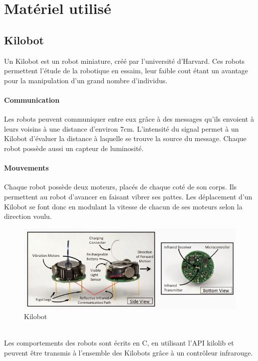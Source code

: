 \documentclass[a4paper]{article}
\begin{document}
\section{Matériel utilisé}
\subsection{Kilobot}
Un Kilobot \cite{rubenstein_kilobot:_2012} est un robot miniature, créé par l'université d'Harvard. Ces robots permettent l'étude de la robotique en essaim, leur faible cout étant un avantage pour la manipulation d'un grand nombre d'individus.
\paragraph{Communication}Les robots peuvent communiquer entre eux grâce à des messages qu'ils envoient à leurs voisins à une distance d'environ 7cm. L'intensité du signal permet à un Kilobot d'évaluer la distance à laquelle se trouve la source du message. Chaque robot possède aussi un capteur de luminosité.
\paragraph{Mouvements}Chaque robot possède deux moteurs, placés de chaque coté de son corps. Ils permettent au robot d'avancer en faisant vibrer ses pattes. Les déplacement d'un Kilobot se font donc en modulant la vitesse de chacun de ses moteurs selon la direction voulu.\\
\begin{figure}[h]
	\begin{center}
		\centering
		\includegraphics[width=0.8\linewidth]{incl/kilobot-closeup-overview.jpg}
		\caption{Kilobot}
	\end{center}
\end{figure} \\
Les comportements des robots sont écrits en C, en utilisant l'API kilolib et peuvent être transmis à l'ensemble des Kilobots  grâce à un contrôleur infrarouge.
\end{document}
